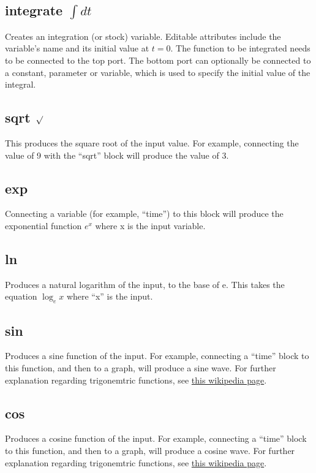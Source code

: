 \subsection{integrate $\int dt$}\label{IntOp}  Creates an integration (or stock)
variable. Editable attributes include the variable's name and its
initial value at $t=0$. The function to be integrated needs to be
connected to the top port. The bottom port can optionally be connected
to a constant, parameter or variable, which is used to specify the
initial value of the integral.

\subsection{sqrt $\surd$}\label{Operation:sqrt} This produces the square root of 
the input value. For example, connecting the value of 9 with the ``sqrt'' block will
produce the value of 3.

\subsection{exp}\label{Operation:exp} Connecting a variable (for example, ``time'')
to this block will produce the exponential function $e^{x}$ where x is the input variable. 

\subsection{ln}\label{Operation:ln} Produces a natural logarithm of the input, to the base of e.
This takes the equation $\log_{e} x$ where ``x'' is the input.

\subsection{sin}\label{Operation:sin} Produces a sine function of the input. For example, 
connecting a ``time'' block to this function, and then to a graph, will produce a sine wave.
For further explanation regarding trigonemtric functions, 
see \href{https://en.wikipedia.org/wiki/Trigonometric_functions}{this wikipedia page}.

\subsection{cos}\label{Operation:cos} Produces a cosine function of the input. For example, 
connecting a ``time'' block to this function, and then to a graph, will produce a cosine wave.
For further explanation regarding trigonemtric functions, 
see \href{https://en.wikipedia.org/wiki/Trigonometric_functions}{this wikipedia page}.


